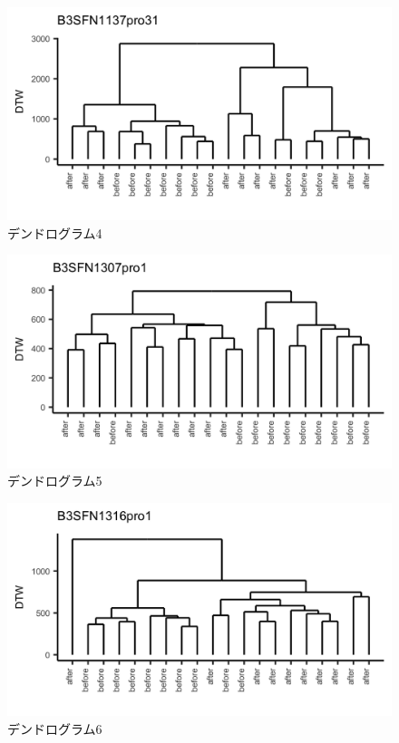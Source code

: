 \documentclass{jarticle}
\begin{document}
\begin{figure}[H]
	\begin{center}
		\includegraphics[width=15cm]{fig/dendro_4.png}
		\caption{デンドログラム4}
		\label{fig:dendro4}
	\end{center}
\end{figure}
\begin{figure}[H]
	\begin{center}
		\includegraphics[width=15cm]{fig/dendro_5.png}
		\caption{デンドログラム5}
		\label{fig:dendro5}
	\end{center}
\end{figure}
\begin{figure}[H]
	\begin{center}
		\includegraphics[width=15cm]{fig/dendro_6.png}
		\caption{デンドログラム6}
		\label{fig:dendro6}
	\end{center}
\end{figure}
\end{document}
